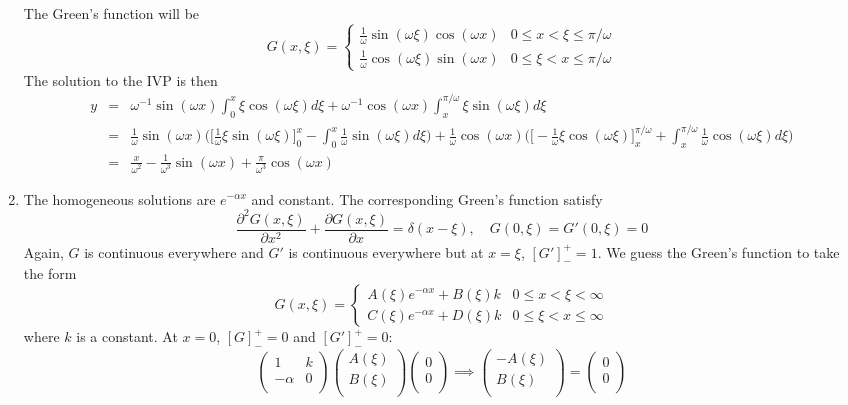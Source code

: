 \documentclass[a4paper]{article}
\begin{document}
\begin{ans}
\begin{enumerate}[label=(\alph*)]
The Green's function will be 
$$G(x,\xi)=
\left\{
        \begin{array}{ll}
      \frac{1}{\omega}\sin(\omega\xi)\cos(\omega x) & 0\leq x<\xi\leq\pi/\omega \\
      \frac{1}{\omega}\cos(\omega\xi)\sin(\omega x) & 0\leq\xi< x\leq\pi/\omega 
        \end{array}
    \right.$$
The solution to the IVP is then
\begin{eqnarray}
y&=&\omega^{-1}\sin(\omega x)\int_0^x\xi\cos(\omega\xi)d\xi+\omega^{-1}\cos(\omega x)\int_x^{\pi/\omega}\xi\sin(\omega \xi)d\xi\nonumber\\&=&\frac{1}{\omega}\sin(\omega x)\bigg(\bigg[\frac{1}{\omega}\xi\sin(\omega\xi)\bigg]^x_0-\int_0^x\frac{1}{\omega}\sin(\omega\xi)d\xi\bigg)+\frac{1}{\omega}\cos(\omega x)\bigg(\bigg[-\frac{1}{\omega}\xi\cos(\omega\xi)\bigg]^{\pi/\omega}_x+\int_x^{\pi/\omega}\frac{1}{\omega}\cos(\omega\xi)d\xi\bigg)\nonumber\\&=&\frac{x}{\omega^2}-\frac{1}{\omega^3}\sin(\omega x)+\frac{\pi}{\omega^3}\cos(\omega x)\nonumber
\end{eqnarray}
\item The homogeneous solutions are $e^{-\alpha x}$ and constant. The corresponding Green's function satisfy
$$\frac{\partial^2G(x,\xi)}{\partial x^2}+\frac{\partial G(x,\xi)}{\partial x}=\delta(x-\xi),\quad G(0,\xi)=G'(0,\xi)=0$$
Again, $G$ is continuous everywhere and $G'$ is continuous everywhere but at $x=\xi$, $[G']_-^+=1$. We guess the Green's function to take the form
$$G(x,\xi)=
\left\{
        \begin{array}{ll}
      A(\xi)e^{-\alpha x}+B(\xi)k & 0\leq x<\xi<\infty \\
      C(\xi)e^{-\alpha x}+D(\xi)k & 0\leq\xi< x\leq \infty
        \end{array}
    \right.$$
where $k$ is a constant. At $x=0$, $[G]_-^+=0$ and $[G']_-^+=0$:
$$\begin{pmatrix}1&k\\-\alpha&0\\\end{pmatrix}\begin{pmatrix}A(\xi)\\B(\xi)\\\end{pmatrix}\begin{pmatrix}0\\0\\\end{pmatrix}\implies\begin{pmatrix}-A(\xi)\\B(\xi)\\\end{pmatrix}=\begin{pmatrix}0\\0\\\end{pmatrix}$$

\end{enumerate}
\end{ans}
\end{document}
